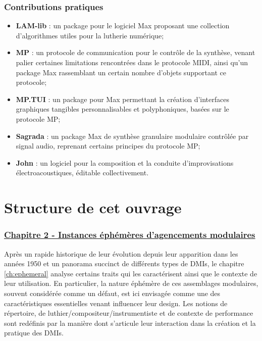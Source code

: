 \subsubsection*{Contributions pratiques}

\begin{itemize}[noitemsep]
\item \textbf{LAM-lib} : un package pour le logiciel Max proposant une collection d'algorithmes utiles pour la lutherie numérique;
\item \textbf{MP} : un protocole de communication pour le contrôle de la synthèse, venant palier certaines limitations rencontrées dans le protocole MIDI, ainsi qu'un package Max rassemblant un certain nombre d'objets supportant ce protocole;
\item \textbf{MP.TUI} : un package pour Max permettant la création d'interfaces graphiques tangibles personnalisables et polyphoniques, basées sur le protocole MP;
\item \textbf{Sagrada} : un package Max de synthèse granulaire modulaire contrôlée par signal audio, reprenant certains principes du protocole MP;
\item \textbf{John} : un logiciel pour la composition et la conduite d'improvisations électroacoustiques, éditable collectivement.
\end{itemize}


\section{Structure de cet ouvrage}
\label{sec:preamble:structure}


\subsubsection*{\hyperref[ch:ephemeral]{Chapitre 2 - Instances éphémères d'agencements modulaires}}

\noindent Après un rapide historique de leur évolution depuis leur apparition dans les années 1950 et un panorama succinct de différents types de \glspl{DMI}, le chapitre \ref{ch:ephemeral} analyse certains traits qui les caractérisent ainsi que le contexte de leur utilisation. En particulier, la nature éphémère de ces assemblages modulaires, souvent considérée comme un défaut, est ici envisagée comme une des caractéristiques essentielles venant influencer leur design. Les notions de répertoire, de luthier/compositeur/instrumentiste et de contexte de performance sont redéfinis par la manière dont s'articule leur interaction dans la création et la pratique des \glspl{DMI}.

